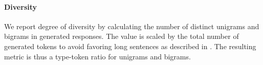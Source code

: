 \paragraph{Diversity} 
We report degree of diversity by calculating
the number of distinct unigrams and bigrams
in generated responses. The value is scaled by the total
number of generated tokens to avoid favoring long
sentences as described in .
The resulting metric is thus a type-token ratio for unigrams and bigrams.

